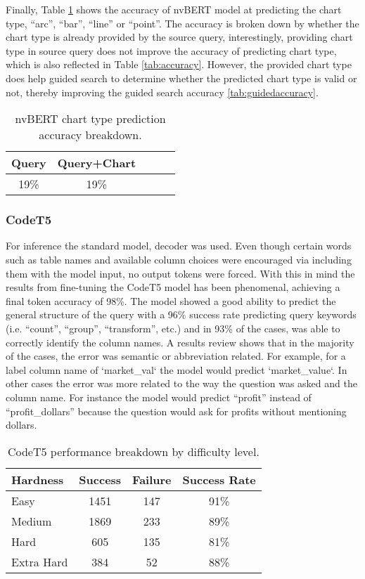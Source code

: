 \documentclass[
	a4paper, %
	10pt, %
	unnumberedsections, %
	twoside, %
]{t0003}
\begin{document}
Finally, Table \ref{tab:chartaccuracy} shows the accuracy of nvBERT model at predicting the chart type, ``arc'', ``bar'', ``line'' or ``point''. The accuracy is broken down by whether the chart type is already provided by the source query, interestingly, providing chart type in source query does not improve the accuracy of predicting chart type, which is also reflected in Table \ref{tab:accuracy}. However, the provided chart type does help guided search to determine whether the predicted chart type is valid or not, thereby improving the guided search accuracy \ref{tab:guidedaccuracy}.

\begin{table}
	\caption{nvBERT chart type prediction accuracy breakdown.}
	\centering
	\begin{tabular}{ccccc}
		\toprule
		Query & Query+Chart  \\
		\midrule
		19\% & 19\% \\
		\bottomrule
	\end{tabular}
	\label{tab:chartaccuracy}
\end{table}

\subsubsection{CodeT5} For inference the standard model, decoder was used. Even though certain words such as table names and available column choices were encouraged via including them with the model input, no output tokens were forced. With this in mind the results from fine-tuning the CodeT5 model has been phenomenal, achieving a final token accuracy of 98\%.  The model showed a good ability to predict the general structure of the query with a 96\% success rate predicting query keywords (i.e. “count”, “group”, “transform”, etc.) and in 93\% of the cases, was able to correctly identify the column names.  A results review shows that in the majority of the cases, the error was semantic or abbreviation related. For example, for a label column name of `market\_val` the model would predict `market\_value`. In other cases the error was more related to the way the question was asked and the column name. For instance the model would predict “profit” instead of “profit\_dollars” because the question would ask for profits without mentioning dollars.  

\begin{table}
	\caption{CodeT5 performance breakdown by difficulty level.}
	\centering
	\begin{tabular}{lccc}
		\toprule
		Hardness & Success & Failure & Success Rate \\
		\midrule
		Easy & 1451 & 147 & 91\% \\
		Medium & 1869 & 233 & 89\% \\
		Hard & 605 & 135 & 81\% \\
		Extra Hard & 384 & 52 & 88\% \\
		\bottomrule
	\end{tabular}
	\label{tab:codet5rate}
\end{table}
\end{document}
